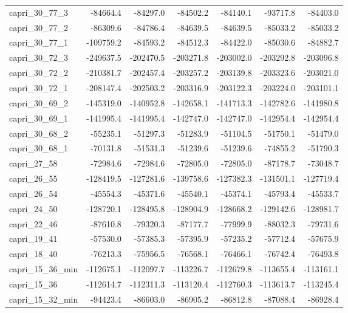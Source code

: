 \begin{table}[h]
\begin{center}
\begin{tabular}{ l | r | r | r | r | r | r }
       capri\_30\_77\_3 & -84664.4 & -84297.0 & -84502.2 & -84140.1 & -93717.8 & -84403.0 \\
       capri\_30\_77\_2 & -86309.6 & -84786.4 & -84639.5 & -84639.5 & -85033.2 & -85033.2 \\
       capri\_30\_77\_1 & -109759.2 & -84593.2 & -84512.3 & -84422.0 & -85030.6 & -84882.7 \\
       capri\_30\_72\_3 & -249637.5 & -202470.5 & -203271.8 & -203002.0 & -203292.8 & -203096.8 \\
       capri\_30\_72\_2 & -210381.7 & -202457.4 & -203257.2 & -203139.8 & -203323.6 & -203021.0 \\
       capri\_30\_72\_1 & -208147.4 & -202503.2 & -203316.9 & -203122.3 & -203224.0 & -203101.1 \\
       capri\_30\_69\_2 & -145319.0 & -140952.8 & -142658.1 & -141713.3 & -142782.6 & -141980.8 \\
       capri\_30\_69\_1 & -141995.4 & -141995.4 & -142747.0 & -142747.0 & -142954.4 & -142954.4 \\
       capri\_30\_68\_2 & -55235.1 & -51297.3 & -51283.9 & -51104.5 & -51750.1 & -51479.0 \\
       capri\_30\_68\_1 & -70131.8 & -51531.3 & -51239.6 & -51239.6 & -74855.2 & -51790.3 \\
       capri\_27\_58 & -72984.6 & -72984.6 & -72805.0 & -72805.0 & -87178.7 & -73048.7 \\
       capri\_26\_55 & -128419.5 & -127281.6 & -139758.6 & -127382.3 & -131501.1 & -127719.4 \\
       capri\_26\_54 & -45554.3 & -45371.6 & -45540.1 & -45374.1 & -45793.4 & -45533.7 \\
       capri\_24\_50 & -128720.1 & -128495.8 & -128904.9 & -128668.2 & -129142.6 & -128981.7 \\
       capri\_22\_46 & -87610.8 & -79320.3 & -87177.7 & -77999.9 & -88032.3 & -79731.6 \\
       capri\_19\_41 & -57530.0 & -57385.3 & -57395.9 & -57235.2 & -57712.4 & -57675.9 \\
       capri\_18\_40 & -76213.3 & -75956.5 & -76568.1 & -76466.1 & -76742.4 & -76493.8 \\
       capri\_15\_36\_min & -112675.1 & -112097.7 & -113226.7 & -112679.8 & -113655.4 & -113161.1 \\
       capri\_15\_36 & -112614.7 & -112311.3 & -113120.4 & -112760.3 & -113613.7 & -113245.4 \\
       capri\_15\_32\_min & -94423.4 & -86603.0 & -86905.2 & -86812.8 & -87088.4 & -86928.4 \\

\end{tabular}
\end{center}
\end{table}
